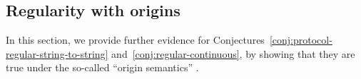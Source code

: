 \subsection{Regularity with origins}
\label{sec:regularity-with-origins}

In this section, we provide further evidence for
Conjectures~\ref{conj:protocol-regular-string-to-string}
and~\ref{conj:regular-continuous}, by showing that they are true under the
so-called ``origin semantics''
\cite{bojanczykTransducersOriginInformation2014}.
